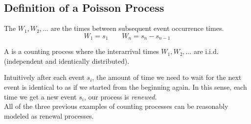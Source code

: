 \documentclass{article}
\begin{document}
    \begin{center}
    \end{center}
    \subsection{Definition of a Poisson Process}
    \begin{definition}
        The  $W_1, W_2, \ldots$ are the times between subsequent event occurrence times.
        \[ W_1 = s_1 \qquad W_n = s_n - s_{n-1} \]
    \end{definition}
    \begin{definition}
        A  is a counting process where the interarrival times $W_1, W_2, \ldots$ are i.i.d. (independent and identically distributed).
    \end{definition}
    Intuitively after each event $s_i$, the amount of time we need to wait for the next event is identical to as if we started from the beginning again. In this sense, each time we get a new event $s_i$, our process is \textit{renewed}.\\

    All of the three previous examples of counting processes  can be reasonably modeled as renewal processes.
\end{document}

